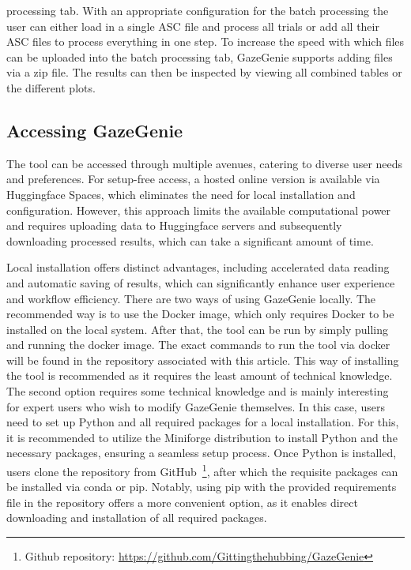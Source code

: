 \documentclass[twocolumn]{article}
\begin{document}
processing tab. With an appropriate configuration for the batch processing the user can either load in a single ASC file and process all trials or add all their ASC files to process everything in one step. To increase the speed with which files can be uploaded into the batch processing tab, GazeGenie supports adding files via a zip file. The results can then be inspected by viewing all combined tables or the different plots.

\subsection{Accessing GazeGenie}

The tool can be accessed through multiple avenues, catering to diverse user needs and preferences. For setup-free access, a hosted online version is available via Huggingface Spaces, which eliminates the need for local installation and configuration. However, this approach limits the available computational power and requires uploading data to Huggingface servers and subsequently downloading processed results, which can take a significant amount of time.

Local installation offers distinct advantages, including accelerated data reading and automatic saving of results, which can significantly enhance user experience and workflow efficiency. There are two ways of using GazeGenie locally. The recommended way is to use the Docker image, which only requires Docker to be installed on the local system. After that, the tool can be run by simply pulling and running the docker image. The exact commands to run the tool via docker will be found in the repository associated with this article. This way of installing the tool is recommended as it requires the least amount of technical knowledge. The second option requires some technical knowledge and is mainly interesting for expert users who wish to modify GazeGenie themselves. In this case, users need to set up Python and all required packages for a local installation. For this, it is recommended to utilize the Miniforge distribution to install Python and the necessary packages, ensuring a seamless setup process. Once Python is installed, users clone the repository from GitHub~\footnote{Github repository: \url{https://github.com/Gittingthehubbing/GazeGenie}}, after which the requisite packages can be installed via conda or pip. Notably, using pip with the provided requirements file in the repository offers a more convenient option, as it enables direct downloading and installation of all required packages.
\end{document}
